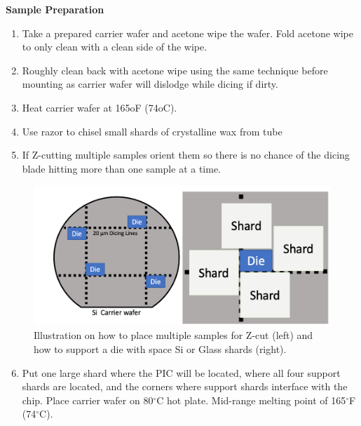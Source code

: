 \textbf{Sample Preparation}
\begin{enumerate}
    \item Take a prepared carrier wafer and acetone wipe the wafer. Fold acetone wipe to only clean with a clean side of the wipe. 
    \item Roughly clean back with acetone wipe using the same technique before mounting as carrier wafer will dislodge while dicing if dirty. 
    \item Heat carrier wafer at 165oF (74oC).
    \item Use razor to chisel small shards of crystalline wax from tube
    \item If Z-cutting multiple samples orient them so there is no chance of the dicing blade hitting more than one sample at a time.
\end{enumerate}

\begin{figure}[!ht]
\centering
\includegraphics[width=5in]{./Figures/AppendixA/FigAppA06}
\caption[Illustration on how to place multiple samples for Z-cut and how to support a die with space Si or Glass shards.]{Illustration on how to place multiple samples for Z-cut (left) and how to support a die with space Si or Glass shards (right).}
\label{FigAppA6}
\end{figure}

\begin{enumerate}
    \setcounter{enumi}{5}
    \item Put one large shard where the PIC will be located, where all four support shards are located, and the corners where support shards interface with the chip. Place carrier wafer on 80$^{\circ}$C hot plate. Mid-range melting point of 165$^{\circ}$F (74$^{\circ}$C).
\end{enumerate}

